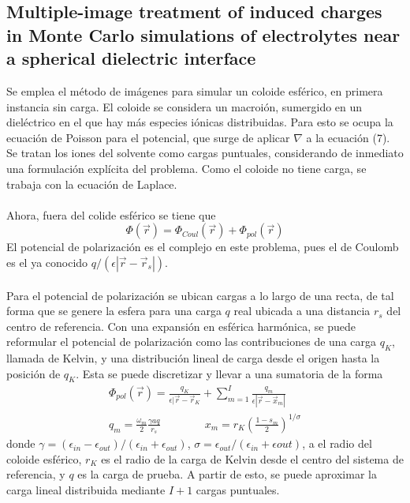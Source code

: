 \documentclass[12pt, notitlepage]{article}
\begin{document}
\subsection{Multiple-image treatment of induced charges in Monte Carlo simulations of electrolytes near a spherical dielectric interface \cite{Gan}}
Se emplea el método de imágenes para simular un coloide esférico, en primera instancia sin carga. El coloide se considera un macroión, sumergido en un dieléctrico en el que hay más especies iónicas distribuidas. Para esto se ocupa la ecuación de Poisson para el potencial, que surge de aplicar $\nabla$ a la ecuación (7). Se tratan los iones del solvente como cargas puntuales, considerando de inmediato una formulación explícita del problema. Como el coloide no tiene carga, se trabaja con la ecuación de Laplace.\\\\
Ahora, fuera del colide esférico se tiene que
\begin{equation*}
\Phi(\vec{r}) = \Phi_{Coul}(\vec{r}) + \Phi_{pol}(\vec{r})
\end{equation*}
El potencial de polarización es el complejo en este problema, pues el de Coulomb es el ya conocido $q/(\epsilon|\vec{r}-\vec{r}_s|)$.\\\\
Para el potencial de polarización se ubican cargas a lo largo de una recta, de tal forma que se genere la esfera para una carga $q$ real ubicada a una distancia $r_s$ del centro de referencia. Con una expansión en esférica harmónica, se puede reformular el potencial de polarización como las contribuciones de una carga $q_K$, llamada de Kelvin, y una distribución lineal de carga desde el origen hasta la posición de $q_K$. Esta se puede discretizar y llevar a una sumatoria de la forma
\begin{gather*}
\Phi_{pol}(\vec{r}) = \frac{q_K}{\epsilon|\vec{r} - \vec{r}_K} + \sum_{m = 1}^I \frac{q_m}{\epsilon|\vec{r} - \vec{x}_m|}\\
q_m = \frac{\omega_m}{2}\frac{\gamma a q}{r_s}\qquad\qquad x_m = r_K\left(\frac{1-s_m}{2}\right)^{1/\sigma}
\end{gather*}
donde $\gamma=(\epsilon_{in} - \epsilon_{out})/(\epsilon_{in}+ \epsilon_{out})$, $\sigma = \epsilon_{out}/(\epsilon_{in} + \epsilon{out})$, a el radio del coloide esférico, $r_K$ es el radio de la carga de Kelvin desde el centro del sistema de referencia, y $q$ es la carga de prueba. A partir de esto, se puede aproximar la carga lineal distribuida mediante $I + 1$ cargas puntuales.
\end{document}
